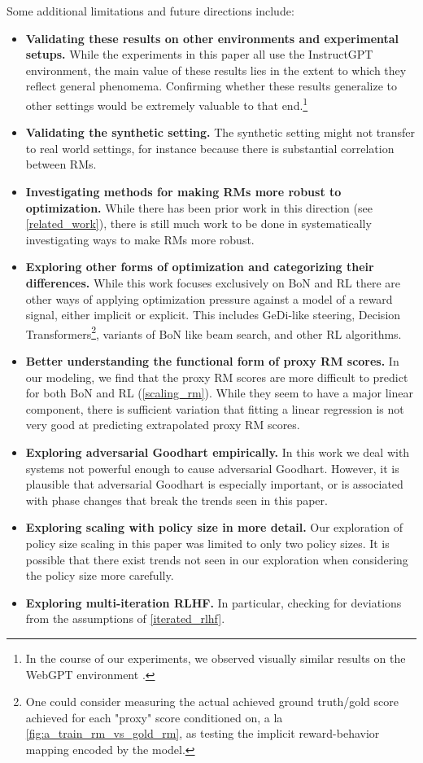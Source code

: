 \documentclass{article}
\theoremstyle{plain}
\begin{document}
Some additional limitations and future directions include:

\begin{itemize}
    \item \textbf{Validating these results on other environments and experimental setups.} While the experiments in this paper all use the InstructGPT environment, the main value of these results lies in the extent to which they reflect general phenomema. Confirming whether these results generalize to other settings would be extremely valuable to that end.\footnote{In the course of our experiments, we observed visually similar results on the WebGPT environment \citep{webgpt}.} 
    \item \textbf{Validating the synthetic setting.} The synthetic setting might not transfer to real world settings, for instance because there is substantial correlation between RMs. 
    \item \textbf{Investigating methods for making RMs more robust to optimization.} While there has been prior work in this direction (see \cref{related_work}), there is still much work to be done in systematically investigating ways to make RMs more robust.
    \item \textbf{Exploring other forms of optimization and categorizing their differences.} While this work focuses exclusively on BoN and RL there are other ways of applying optimization pressure against a model of a reward signal, either implicit or explicit. This includes GeDi-like steering, Decision Transformers\footnote{One could consider measuring the actual achieved ground truth/gold score achieved for each "proxy" score conditioned on, a la \cref{fig:a_train_rm_vs_gold_rm}, as testing the implicit reward-behavior mapping encoded by the model.}, variants of BoN like beam search, and other RL algorithms.
    \item \textbf{Better understanding the functional form of proxy RM scores.} In our modeling, we find that the proxy RM scores are more difficult to predict for both BoN and RL (\cref{scaling_rm}). While they seem to have a major linear component, there is sufficient variation that fitting a linear regression is not very good at predicting extrapolated proxy RM scores.
    \item \textbf{Exploring adversarial Goodhart empirically.} In this work we deal with systems not powerful enough to cause adversarial Goodhart. However, it is plausible that adversarial Goodhart is especially important, or is associated with phase changes that break the trends seen in this paper.
    \item \textbf{Exploring scaling with policy size in more detail.} Our exploration of policy size scaling in this paper was limited to only two policy sizes. It is possible that there exist trends not seen in our exploration when considering the policy size more carefully.
    \item \textbf{Exploring multi-iteration RLHF.} In particular, checking for deviations from the assumptions of \cref{iterated_rlhf}.
\end{itemize}
\end{document}

